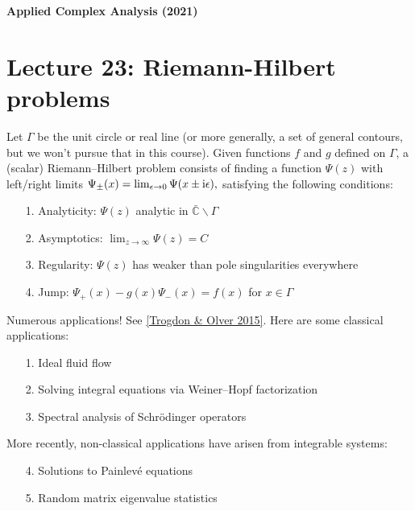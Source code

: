 \documentclass[12pt,landscape]{article}
\def\I{ {\rm i} }
\def\C{ {\mathbb C} }
\def\endash{–}
\begin{document}
{\LARGE
\sf
\textbf{Applied Complex Analysis (2021)}

\section{Lecture 23: Riemann-Hilbert problems}
Let $\Gamma$ be the unit circle or real line (or more generally, a set of general contours, but we won't pursue that in this course). Given functions $f$ and $g$ defined on $\Gamma$, a (scalar) Riemann\ensuremath{\endash}Hilbert problem consists of finding a function $\Psi(z)$ with left/right limits $\Psi_\pm(x) = \lim_{\epsilon \rightarrow 0} \Psi(x \pm \I \epsilon),$ satisfying the following conditions:

\begin{itemize}
\item[1. ] Analyticity: $\Psi(z)$ analytic in $\bar\C \backslash \Gamma$


\item[2. ] Asymptotics: $\lim_{z \rightarrow \infty} \Psi(z) = C$


\item[3. ] Regularity: $\Psi(z)$ has weaker than pole singularities everywhere


\item[4. ] Jump: $\Psi_+(x) - g(x) \Psi_-(x) = f(x)$ for $x \in \Gamma$

\end{itemize}
\newpage
Numerous applications! See \href{http://bookstore.siam.org/ot146/}{[Trogdon \& Olver 2015]}. Here are some classical applications:

\begin{itemize}
\item[1. ] Ideal fluid flow


\item[2. ] Solving integral equations via Weiner\ensuremath{\endash}Hopf factorization


\item[3. ] Spectral analysis of Schrödinger operators

\end{itemize}
More recently, non-classical applications have arisen from integrable systems:

\begin{itemize}
\item[4. ] Solutions to Painlevé equations


\item[5. ] Random matrix eigenvalue statistics


\end{itemize}}
\end{document}
